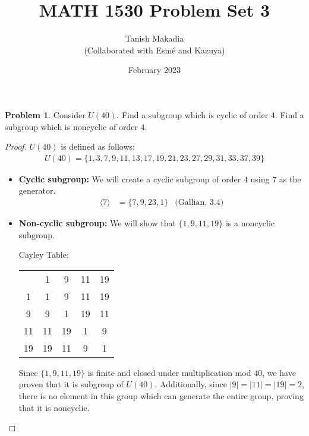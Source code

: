 \documentclass[12pt,reqno]{article}
\title{MATH 1530 Problem Set 3}
\author{Tanish Makadia\\\small{(Collaborated with Esmé and Kazuya)}}
\date{February 2023}
\theoremstyle{plain}
\theoremstyle{definition}
\newtheorem{problem}{Problem}
\begin{document}
\maketitle


\begin{problem} 
    Consider $U(40)$. Find a subgroup which is cyclic of order 4. Find a subgroup which is noncyclic of order 4. 
\end{problem}

\begin{proof}
    \(U(40)\) is defined as follows:
    \begin{align*}
        U(40) = \{1,3,7,9,11,13,17,19,21,23,27,29,31,33,37,39\}
    \end{align*}

    \begin{itemize}
        \item \textbf{Cyclic subgroup:} We will create a cyclic subgroup of order \(4\) using \(7\) as the generator.
        \begin{align*}
            \langle 7\rangle &= \{7,9,23,1\} & \text{(Gallian, 3.4)}
        \end{align*}
        \item \textbf{Non-cyclic subgroup:} We will show that \(\{1,9,11,19\}\) is a noncyclic subgroup.

        Cayley Table:
        \begin{tabular}{c | c c c c}
            & 1 & 9 & 11 & 19\\
            \cline{1-5}
            1 & 1 & 9 & 11 & 19 \\
            9 & 9 & 1 & 19 & 11 \\
            11 & 11 & 19 & 1 & 9 \\
            19 & 19 & 11 & 9 & 1
        \end{tabular}
    
        Since \(\{1,9,11,19\}\) is finite and closed under multiplication mod \(40\), we have proven
        that it is subgroup of \(U(40)\). Additionally, since \(|9|=|11|=|19|=2\), there is no element
        in this group which can generate the entire group, proving that it is noncyclic.
    
    \end{itemize}
\end{proof}

\newpage

\end{document}
